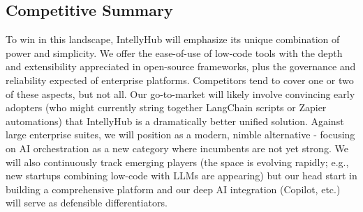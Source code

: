 \documentclass[11pt, a4paper, oneside]{article}
\begin{document}
\subsection{Competitive Summary}
To win in this landscape, IntellyHub will emphasize its unique combination of power and simplicity. We offer the ease-of-use of low-code tools with the depth and extensibility appreciated in open-source frameworks, plus the governance and reliability expected of enterprise platforms. Competitors tend to cover one or two of these aspects, but not all. Our go-to-market will likely involve convincing early adopters (who might currently string together LangChain scripts or Zapier automations) that IntellyHub is a dramatically better unified solution. Against large enterprise suites, we will position as a modern, nimble alternative - focusing on AI orchestration as a new category where incumbents are not yet strong. We will also continuously track emerging players (the space is evolving rapidly; e.g., new startups combining low-code with LLMs are appearing) but our head start in building a comprehensive platform and our deep AI integration (Copilot, etc.) will serve as defensible differentiators.
\end{document}
